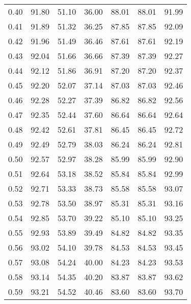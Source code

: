 \begin{tabular}{|c|c|c|c|c|c|c|}
      0.40 &     91.80 &     51.10 &      36.00 &   88.01 &      88.01 &         91.99 \\
      0.41 &     91.89 &     51.32 &      36.25 &   87.85 &      87.85 &         92.09 \\
      0.42 &     91.96 &     51.49 &      36.46 &   87.61 &      87.61 &         92.19 \\
      0.43 &     92.04 &     51.66 &      36.66 &   87.39 &      87.39 &         92.27 \\
      0.44 &     92.12 &     51.86 &      36.91 &   87.20 &      87.20 &         92.37 \\
      0.45 &     92.20 &     52.07 &      37.14 &   87.03 &      87.03 &         92.46 \\
      0.46 &     92.28 &     52.27 &      37.39 &   86.82 &      86.82 &         92.56 \\
      0.47 &     92.35 &     52.44 &      37.60 &   86.64 &      86.64 &         92.64 \\
      0.48 &     92.42 &     52.61 &      37.81 &   86.45 &      86.45 &         92.72 \\
      0.49 &     92.49 &     52.79 &      38.03 &   86.24 &      86.24 &         92.81 \\
      0.50 &     92.57 &     52.97 &      38.28 &   85.99 &      85.99 &         92.90 \\
      0.51 &     92.64 &     53.18 &      38.52 &   85.84 &      85.84 &         92.99 \\
      0.52 &     92.71 &     53.33 &      38.73 &   85.58 &      85.58 &         93.07 \\
      0.53 &     92.78 &     53.50 &      38.97 &   85.31 &      85.31 &         93.16 \\
      0.54 &     92.85 &     53.70 &      39.22 &   85.10 &      85.10 &         93.25 \\
      0.55 &     92.93 &     53.89 &      39.49 &   84.82 &      84.82 &         93.35 \\
      0.56 &     93.02 &     54.10 &      39.78 &   84.53 &      84.53 &         93.45 \\
      0.57 &     93.08 &     54.24 &      40.00 &   84.23 &      84.23 &         93.53 \\
      0.58 &     93.14 &     54.35 &      40.20 &   83.87 &      83.87 &         93.62 \\
      0.59 &     93.21 &     54.52 &      40.46 &   83.60 &      83.60 &         93.70 \\

\end{tabular}
